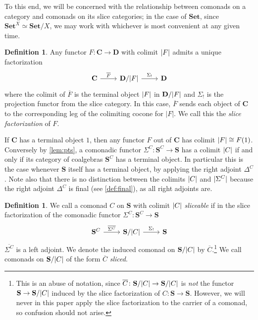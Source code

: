 \documentclass[11pt, oneside, article]{memoir}
\theoremstyle{plain}
\theoremstyle{definition}
\newtheorem{definition}[def]{Definition}
\theoremstyle{remark}
\newenvironment{remark}
{\renewcommand\qedsymbol{$\lrcorner$}%
  \pushQED{\qed}\myremark}
{\popQED\endmyremark}
\DeclarePairedDelimiter{\abs}{\lvert}{\rvert}
\newcommand{\bang}{\mathrm{!}}
\newcommand{\namedcat}[1]{\mathbf{#1}}
\newcommand{\cat}[1]{\mathbf{#1}}
\newcommand{\Set}{\namedcat{Set}}
\newcommand{\CoalgOn}[2]{{#2}^{#1}}
\newcommand{\CoalgS}[1]{\CoalgOn{#1}{\bS}}
\newcommand{\clift}[1]{\overline{#1}}
\newcommand{\pts}[1]{{\abs{#1}}}
\newcommand{\qpts}[1]{\pts{#1}}
\newcommand{\ptlift}[1]{\overline{#1}}
\newcommand{\carr}{\Sigma}
\newcommand{\rcarr}{\Delta}
\newcommand{\slicel}{\Sigma_\bang}
\newcommand{\car}[1]{\carr^{#1}}
\newcommand{\rcar}[1]{\rcarr^{#1}}
\newcommand{\carC}{\car{\cC}}
\newcommand{\rcarC}{\rcar{\cC}}
\newcommand{\cmnd}[1]{{#1}}
\newcommand{\xX}{X}
\newcommand{\cC}{\cmnd{C}}
\newcommand{\bC}{\cat{C}}
\newcommand{\bD}{\cat{D}}
\newcommand{\bS}{\cat{S}}
\newcommand{\CS}{\CoalgS{\cC}}
\newcommand{\qSC}{\bS/\qpts{\cC}}
\newcommand{\slice}{slice}
\begin{document}
To this end, we will be concerned with the relationship between
comonads on a category and comonads on its slice categories; in the
case of $\Set$, since $\Set^\xX \simeq \Set/\xX$, we may work with
whichever is most convenient at any given time.


\begin{definition}\label{def:slice}
  Any functor $F \colon \bC \to \bD$ with colimit $\pts{F}$ admits a
  unique factorization
  \[\begin{tikzcd}
      \bC & {\bD/\pts{F}} & \bD \arrow["{\ptlift{F}}", from=1-1,
      to=1-2] \arrow["{\slicel}", from=1-2, to=1-3]
    \end{tikzcd}\] where the colimit of $\ptlift{F}$ is the terminal
  object $\pts{F}$ in $\bD/\pts{F}$ and $\slicel$ is the projection
  functor from the slice category. In this case, $\ptlift{F}$ sends 
  each object of $\bC$ to the corresponding leg of the colimiting cocone for $|F|$. 
  We call this the \emph{{\slice} factorization} of $F$.
\end{definition}

\begin{remark}
  If $\bC$ has a terminal object $1$, then any functor $F$ out of
  $\bC$ has colimit $\pts{F} \cong F(1)$. Conversely by
  \cref{lem:pts}, a comonadic functor $\carC \colon \CS \to \bS$ has a
  colimit $\pts{\cC}$ if and only if its category of coalgebras $\CS$
  has a terminal object. In particular this is the case whenever $\bS$
  itself has a terminal object, by applying the right adjoint
  $\rcarC$. Note also that there is no distinction between the
  colimits $\qpts{\cC}$ and $\qpts{\carC}$ because the right adjoint
  $\rcarC$ is final (see \cref{def:final}), as all right
  adjoints are.
\end{remark}

\begin{definition}\label{def:sliceable}
  We call a comonad $\cC$ on $\bS$ with colimit $\pts{\cC}$
  \emph{sliceable} if in the {\slice} factorization of the comonadic
  functor $\carC \colon \CS \to \bS$
  \[\begin{tikzcd}
      {\CS} & {\qSC} & \bS
      \arrow["\ptlift{\carC}", from=1-1, to=1-2]
      \arrow["{\slicel}", from=1-2, to=1-3]
    \end{tikzcd}\] $\ptlift{\carC}$ is a left adjoint. We denote the
  induced comonad on $\qSC$ by $\clift{\cC}$.\footnote{This is an
    abuse of notation, since $\clift{\cC} \colon \qSC \to \qSC$ is
    \emph{not} the functor $\bS \to \qSC$ induced by the {\slice}
    factorization of $\cC \colon \bS \to \bS$. However, we will never
    in this paper apply the {\slice} factorization to the carrier of a
    comonad, so confusion should not arise.} We call comonads on
  $\qSC$ of the form $\clift{\cC}$ \emph{sliced}.
\end{definition}
\end{document}
